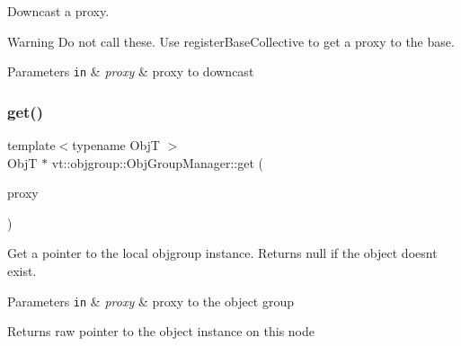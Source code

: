 Downcast a proxy. 

\begin{DoxyWarning}{Warning}
Do not call these. Use {\ttfamily register\+Base\+Collective} to get a proxy to the base.
\end{DoxyWarning}

\begin{DoxyParams}[1]{Parameters}
\mbox{\tt in}  & {\em proxy} & proxy to downcast \\
\hline
\end{DoxyParams}
\mbox{\label{structvt_1_1objgroup_1_1_obj_group_manager_a4b11402fc31ca40e1dd2eacb65101e2b}} 
\subsubsection{\texorpdfstring{get()}{get()}\hspace{0.1cm}{\footnotesize\ttfamily [1/2]}}
{\footnotesize\ttfamily template$<$typename ObjT $>$ \\
ObjT $\ast$ vt\+::objgroup\+::\+Obj\+Group\+Manager\+::get (\begin{DoxyParamCaption}\item[{\hyperlink{structvt_1_1objgroup_1_1_obj_group_manager_aea65eef52f240a52210132eef5ce591f}{Proxy\+Type}$<$ ObjT $>$}]{proxy }\end{DoxyParamCaption})}



Get a pointer to the local objgroup instance. Returns null if the object doesn\textquotesingle{}t exist. 


\begin{DoxyParams}[1]{Parameters}
\mbox{\tt in}  & {\em proxy} & proxy to the object group\\
\hline
\end{DoxyParams}
\begin{DoxyReturn}{Returns}
raw pointer to the object instance on this node 
\end{DoxyReturn}
\mbox{\label{structvt_1_1objgroup_1_1_obj_group_manager_a70e5e1d0ada31d6f88a8ec88965df895}} 
